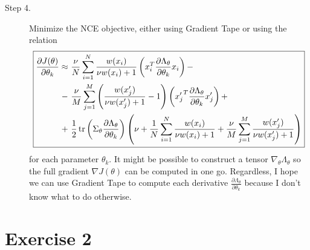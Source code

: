 \documentclass[a4paper]{article}
\begin{document}
\begin{description}
\item[Step 4.] Minimize the NCE objective, either using Gradient Tape or using the relation
$$\boxed{\begin{aligned}
\frac{\partial J(\theta)}{\partial \theta_k} \approx \ &\frac{\nu}{N} \sum_{i=1}^N \frac{w(x_i)}{\nu w(x_i) + 1} \left(x_i^T \frac{\partial \Lambda_\theta}{\partial \theta_k} x_i\right) -\\
- \ &\frac{\nu}{M} \sum_{j=1}^M \left( \frac{w(x_j')}{\nu w(x_j') +  1} - 1\right)  \left( {x_j'}^T  \frac{\partial \Lambda_\theta}{\partial \theta_k} {x_j'} \right)+\\
+ \ &\frac{1}{2}\tr\left( \Sigma_\theta \frac{\partial \Lambda_\theta}{\partial\theta_k}\right) \left(\nu +  \frac{1}{N} \sum_{i=1}^N \frac{w(x_i)}{\nu w(x_i) + 1} + \frac{\nu}{M} \sum_{j=1}^M \frac{w(x_j')}{\nu w(x_j') + 1}\right)
\end{aligned}}$$
for each parameter $\theta_k$. It might be possible to construct a tensor $\nabla_\theta \Lambda_\theta$ so the full gradient $\nabla J(\theta)$ can be computed in one go. Regardless, I hope we can use Gradient Tape to compute each derivative $\frac{\partial \Lambda_\theta}{\partial \theta_k}$ because I don't know what to do otherwise.
\end{description}


































\newpage
\section*{Exercise 2}
\end{document}
